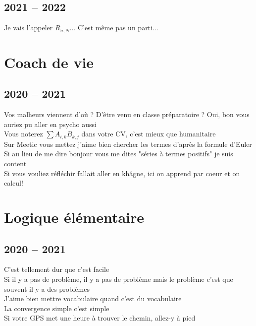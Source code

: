 \documentclass[french, a4paper, openany]{book}
\begin{document}
\section{2021 -- 2022}

	\noindent \og Je vais l'appeler $R_{n,N}$... C'est même pas un parti... \fg \\

\chapter{Coach de vie}

\section{2020 -- 2021}

	\noindent \og Vos malheurs viennent d'où ? D'être venu en classe préparatoire ? Oui, bon vous auriez pu aller en psycho aussi \fg \\
	\og Vous noterez $\sum A_{i,k} B_{k,j}$ dans votre CV, c'est mieux que humanitaire \fg \\
	\og Sur Meetic vous mettez \og j'aime bien chercher les termes d'après la formule d'Euler \fg \\
	\og Si au lieu de me dire bonjour vous me dites "séries à termes positifs" je suis content \fg \\
	\og Si vous vouliez réfléchir fallait aller en khâgne, ici on apprend par coeur et on calcul! \fg \\

\chapter{Logique élémentaire}

\section{2020 -- 2021}

	\noindent \og C'est tellement dur que c'est facile \fg \\
	\og Si il y a pas de problème, il y a pas de problème mais le problème c'est que souvent il y a des problèmes \fg \\
	\og J'aime bien mettre vocabulaire quand c'est du vocabulaire \fg \\
	\og La convergence simple c'est simple \fg \\
	\og Si votre GPS met une heure à trouver le chemin, allez-y à pied \fg \\
\end{document}
